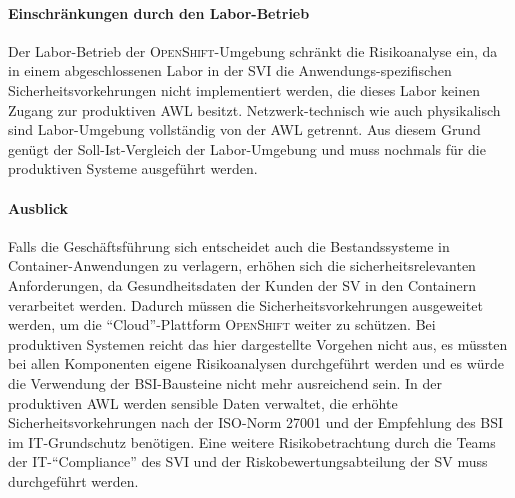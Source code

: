 \paragraph{Einschränkungen durch den Labor-Betrieb} Der Labor-Betrieb der \textsc{OpenShift}-Umgebung schränkt die Risikoanalyse ein, da in einem abgeschlossenen Labor in der \ac{SVI} die Anwendungs-spezifischen Sicherheitsvorkehrungen nicht implementiert werden, die dieses Labor keinen Zugang zur produktiven \ac{AWL} besitzt. Netzwerk-technisch wie auch physikalisch sind Labor-Umgebung vollständig von der \ac{AWL} getrennt. Aus diesem Grund genügt der Soll-Ist-Vergleich der Labor-Umgebung und muss nochmals für die produktiven Systeme ausgeführt werden.

\paragraph{Ausblick} Falls die Geschäftsführung sich entscheidet auch die Bestandssysteme in Container-Anwendungen zu verlagern, erhöhen sich die sicherheitsrelevanten Anforderungen, da Gesundheitsdaten der Kunden der \ac{SV} in den Containern verarbeitet werden. Dadurch müssen die Sicherheitsvorkehrungen ausgeweitet werden, um die \enquote{Cloud}-Plattform \textsc{OpenShift} weiter zu schützen. Bei produktiven Systemen reicht das hier dargestellte Vorgehen nicht aus, es müssten bei allen Komponenten eigene Risikoanalysen durchgeführt werden und es würde die Verwendung der \ac{BSI}-Bausteine nicht mehr ausreichend sein. In der produktiven \ac{AWL} werden sensible Daten verwaltet, die erhöhte Sicherheitsvorkehrungen nach der ISO-Norm 27001\autocite[vgl.][]{dindeutsches_institut_fur_normung_informationstechnik_2020} und der Empfehlung des \ac{BSI} im IT-Grundschutz\autocite[vgl.][]{bundesamt_fur_sicherheit_in_der_informationstechnik_bsi_it-grundschutz-kompendium_2020} benötigen. Eine weitere Risikobetrachtung durch die Teams der IT-\enquote{Compliance} des \ac{SVI} und der Riskobewertungsabteilung der \ac{SV} muss durchgeführt werden. 
